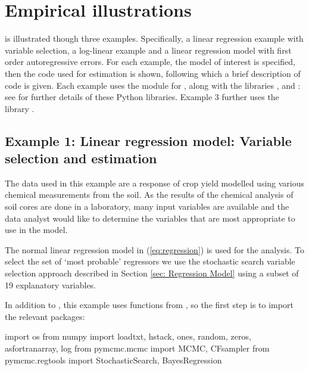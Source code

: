 \documentclass[article]{jss}
\begin{document}
\section{Empirical illustrations}
\label{sec:Empirical-Illustrations}

 is illustrated though three examples. Specifically, a
linear regression example with variable selection, a log-linear
example and a linear regression model with first order autoregressive
errors.  For each example, the model of interest is specified, then
the code used for estimation is shown, following which a brief
description of code is given. Each example uses the module for
, along with the  libraries ,
 and : see \citet{NumpyScipy, Matplotlib}
for further details of these Python libraries.  Example 3 further uses
the library  \citep{geus11}.


\subsection{Example 1: Linear regression model: Variable selection and
  estimation}

The data used in this example are a response of crop yield modelled
using various chemical measurements from the soil. As the results of
the chemical analysis of soil cores are done in a laboratory, many
input variables are available and the data analyst would like to
determine the variables that are most appropriate to use in the model.

The normal linear regression model in (\ref{eq:regression}) is used
for the analysis.  To select the set of `most probable'
regressors we use the stochastic search variable selection approach
described in Section \ref{sec: Regression Model} using a subset of 19
explanatory variables.


In addition to , this example uses functions from
, so the first step is to import the relevant packages:

\begin{Code}
import os
from numpy import loadtxt, hstack, ones, random, zeros, asfortranarray, log
from pymcmc.mcmc import MCMC, CFsampler
from pymcmc.regtools import StochasticSearch, BayesRegression
\end{Code}
\end{document}
